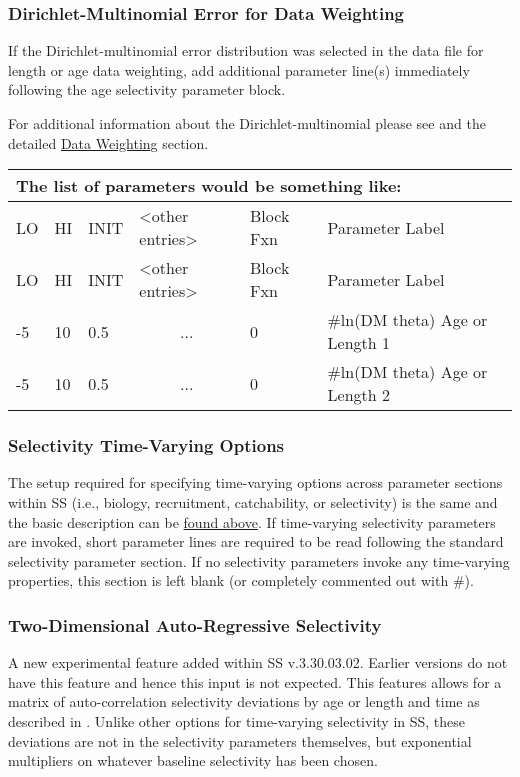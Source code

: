 \hypertarget{Dirichletparameter}{}
\subsubsection{Dirichlet-Multinomial Error for Data Weighting}
If the Dirichlet-multinomial error distribution was selected in the data file for length or age data weighting, add additional parameter line(s) immediately following the age selectivity parameter block.

For additional information about the Dirichlet-multinomial please see \citet{thorson_model-based_2017} and the detailed \hyperlink{DataWeight}{Data Weighting} section.

	
\begin{longtable}{p{1cm} p{1cm} p{1cm} p{2.9cm}  p{1.8cm}  p{6.5cm}}
	\multicolumn{6}{l}{The list of parameters would be something like:}\\
	\hline
	LO \Tstrut & HI & INIT  &  <other entries> & Block Fxn & Parameter Label\Bstrut\\
	\hline
	\endfirsthead
	
	\hline
	LO \Tstrut & HI & INIT & <other entries> & Block Fxn & Parameter Label\Bstrut\\
	\hline
	\endhead

	-5   & 10 & 0.5  & \multicolumn{1}{c}{...}  & 0   & \#ln(DM theta) Age or Length 1 \Tstrut\\
	-5   & 10 & 0.5  & \multicolumn{1}{c}{...}  & 0   & \#ln(DM theta) Age or Length 2\Bstrut\\
	\hline
\end{longtable}


\subsubsection{Selectivity Time-Varying Options}
The setup required for specifying time-varying options across parameter sections within SS (i.e., biology, recruitment, catchability, or selectivity) is the same and the basic description can be \hyperlink{tvOrder}{found above}. If time-varying selectivity parameters are invoked, short parameter lines are required to be read following the standard selectivity parameter section. If no selectivity parameters invoke any time-varying properties, this section is left blank (or completely commented out with \#).


\subsubsection{Two-Dimensional Auto-Regressive Selectivity}
A new experimental feature added within SS v.3.30.03.02. Earlier versions do not have this feature and hence this input is not expected.  This features allows for a matrix of auto-correlation selectivity deviations by age or length and time as described in \citet{xu_new_2019}. Unlike other options for time-varying selectivity in SS, these deviations are not in the selectivity parameters themselves, but exponential multipliers on whatever baseline selectivity has been chosen.  

